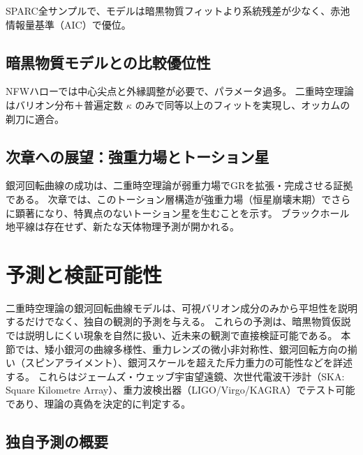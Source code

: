 \documentclass[dvipdfmx,a4paper]{jsbook}
\theoremstyle{definition}
\theoremstyle{remark}
\begin{document}
SPARC全サンプルで、モデルは暗黒物質フィットより系統残差が少なく、赤池情報量基準（AIC）で優位。

\subsection{暗黒物質モデルとの比較優位性}

NFWハローでは中心尖点と外縁調整が必要で、パラメータ過多。  
二重時空理論はバリオン分布＋普遍定数 $\kappa$ のみで同等以上のフィットを実現し、オッカムの剃刀に適合。

\subsection{次章への展望：強重力場とトーション星}

銀河回転曲線の成功は、二重時空理論が弱重力場でGRを拡張・完成させる証拠である。  
次章では、このトーション層構造が強重力場（恒星崩壊末期）でさらに顕著になり、特異点のないトーション星を生むことを示す。  
ブラックホール地平線は存在せず、新たな天体物理予測が開かれる。

\section{予測と検証可能性}
\label{sec:predictions}

二重時空理論の銀河回転曲線モデルは、可視バリオン成分のみから平坦性を説明するだけでなく、独自の観測的予測を与える。  
これらの予測は、暗黒物質仮説では説明しにくい現象を自然に扱い、近未来の観測で直接検証可能である。  
本節では、矮小銀河の曲線多様性、重力レンズの微小非対称性、銀河回転方向の揃い（スピンアライメント）、銀河スケールを超えた斥力重力の可能性などを詳述する。  
これらはジェームズ・ウェッブ宇宙望遠鏡、次世代電波干渉計（SKA: Square Kilometre Array）、重力波検出器（LIGO/Virgo/KAGRA）でテスト可能であり、理論の真偽を決定的に判定する。

\subsection{独自予測の概要}
\end{document}
